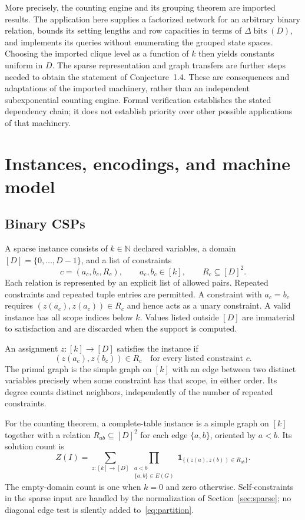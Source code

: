 \documentclass[11pt,reqno]{amsart}
\numberwithin{equation}{section}
\theoremstyle{definition}
\theoremstyle{remark}
\newcommand{\bits}{\operatorname{bits}}
\newcommand{\N}{\mathbb N}
\newcommand{\ind}[1]{\mathbf 1_{\{#1\}}}
\begin{document}
More precisely, the counting engine and its grouping theorem are imported results. The application here supplies a factorized network for an arbitrary binary relation, bounds its setting lengths and row capacities in terms of $\Delta\bits(D)$, and implements its queries without enumerating the grouped state spaces. Choosing the imported clique level as a function of $k$ then yields constants uniform in $D$. The sparse representation and graph transfers are further steps needed to obtain the statement of Conjecture~1.4. These are consequences and adaptations of the imported machinery, rather than an independent subexponential counting engine. Formal verification establishes the stated dependency chain; it does not establish priority over other possible applications of that machinery.

\section{Instances, encodings, and machine model}\label{sec:inputs}

\subsection{Binary CSPs}
A sparse instance consists of $k\in\N$ declared variables, a domain $[D]=\{0,\ldots,D-1\}$, and a list of constraints
\[
 c=(a_c,b_c,R_c),\qquad a_c,b_c\in[k],\qquad R_c\subseteq[D]^2.
\]
Each relation is represented by an explicit list of allowed pairs. Repeated constraints and repeated tuple entries are permitted. A constraint with $a_c=b_c$ requires $(z(a_c),z(a_c))\in R_c$ and hence acts as a unary constraint. A valid instance has all scope indices below $k$. Values listed outside $[D]$ are immaterial to satisfaction and are discarded when the support is computed.

An assignment $z:[k]\to[D]$ satisfies the instance if
\[
 (z(a_c),z(b_c))\in R_c
 \quad\text{for every listed constraint }c.
\]
The primal graph is the simple graph on $[k]$ with an edge between two distinct variables precisely when some constraint has that scope, in either order. Its degree counts distinct neighbors, independently of the number of repeated constraints.

For the counting theorem, a complete-table instance is a simple graph on $[k]$ together with a relation $R_{ab}\subseteq[D]^2$ for each edge $\{a,b\}$, oriented by $a<b$. Its solution count is
\begin{equation}\label{eq:partition}
 Z(I)=\sum_{z:[k]\to[D]}
 \prod_{\substack{a<b\\\{a,b\}\in E(G)}}
 \ind{(z(a),z(b))\in R_{ab}}.
\end{equation}
The empty-domain count is one when $k=0$ and zero otherwise. Self-constraints in the sparse input are handled by the normalization of Section~\ref{sec:sparse}; no diagonal edge test is silently added to~\eqref{eq:partition}.
\end{document}
